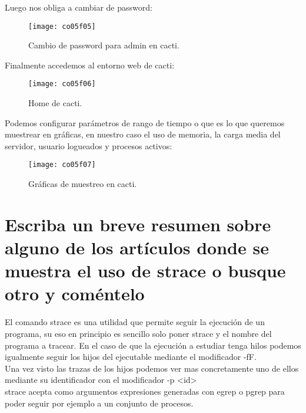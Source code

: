 Luego nos obliga a cambiar de password:

\begin{figure}[H]
	\centering
	\texttt{[image: co05f05]}
	\caption{Cambio de password para admin en cacti.}
	\label{fig:co05f05}
\end{figure}

Finalmente accedemos al entorno web de cacti:
\begin{figure}[H]
	\centering
	\texttt{[image: co05f06]}
	\caption{Home de cacti.}
	\label{fig:co05f06}
\end{figure}

Podemos configurar parámetros de rango de tiempo o que es lo que queremos muestrear en gráficas, en nuestro caso el uso de memoria, la carga media del servidor, usuario logueados y procesos activos:
\begin{figure}[H]
	\centering
	\texttt{[image: co05f07]}
	\caption{Gráficas de muestreo en cacti.}
	\label{fig:co05f07}
\end{figure}



\section{Escriba un breve resumen sobre alguno de los artículos donde se muestra el uso de strace o busque otro y coméntelo}


El comando strace es una utilidad que permite seguir la ejecución de un programa, su eso en principio es sencillo solo poner strace y el nombre del programa a tracear.
En el caso de que la ejecución a estudiar tenga hilos podemos igualmente seguir los hijos del ejecutable mediante el modificador -fF.\\

Una vez visto las trazas de los hijos podemos ver mas concretamente uno de ellos mediante su identificador con el modificador  -p <id>\\

strace acepta como argumentos expresiones generadas con egrep o pgrep para poder seguir por ejemplo a un conjunto de procesos.\\


